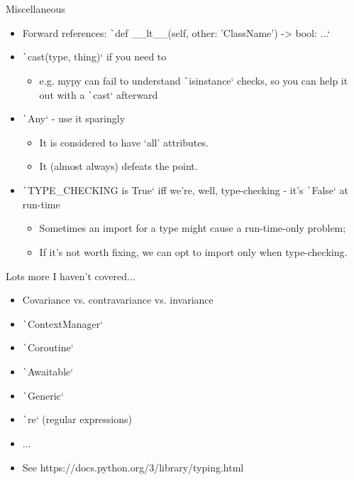 \documentclass[10pt]{beamer}
\begin{document}
\begin{frame}{Miscellaneous}
    \begin{itemize}[<+->]
        \item Forward references: \texttt`def __lt__(self, other: 'ClassName') -> bool: ...`
        \item \texttt`cast(type, thing)` if you need to
        \begin{itemize}
            \item e.g. mypy can fail to understand \texttt`isinstance` checks, so you can help it out with a \texttt`cast` afterward
        \end{itemize}
        \item \texttt`Any` - use it sparingly
        \begin{itemize}
            \item It is considered to have `all' attributes.
            \item It (almost always) defeats the point.
        \end{itemize}
        \item \texttt`TYPE_CHECKING is True` iff we're, well, type-checking - it's \texttt`False` at run-time
        \begin{itemize}
            \item Sometimes an import for a type might cause a run-time-only problem;
            \item If it's not worth fixing, we can opt to import only when type-checking.
        \end{itemize}
    \end{itemize}
\end{frame}

\begin{frame}{Lots more I haven't covered...}
    \begin{itemize}[<+->]
        \item Covariance vs. contravariance vs. invariance
        \item \texttt`ContextManager`
        \item \texttt`Coroutine`
        \item \texttt`Awaitable`
        \item \texttt`Generic`
        \item \texttt`re` (regular expressions)
        \item ...
        \item See https://docs.python.org/3/library/typing.html
    \end{itemize}
\end{frame}
\end{document}
